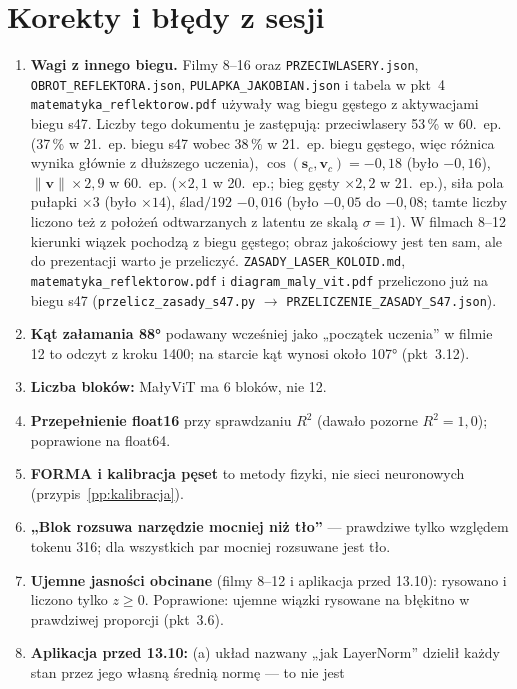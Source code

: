 \documentclass[a4paper,11pt]{article}
\begin{document}
\section{Korekty i błędy z sesji}\label{sec:korekty}
\begin{enumerate}
\item \textbf{Wagi z innego biegu.} Filmy 8--16 oraz \texttt{PRZECIWLASERY.json}, \texttt{OBROT\_REFLEKTORA.json},
\texttt{PULAPKA\_JAKOBIAN.json} i tabela w pkt~4 \texttt{matematyka\_reflektorow.pdf} używały wag biegu gęstego z aktywacjami biegu s47.
Liczby tego dokumentu je zastępują: przeciwlasery 53\,\% w 60.~ep. (37\,\% w 21.~ep. biegu s47 wobec 38\,\% w 21.~ep. biegu gęstego, więc
różnica wynika głównie z dłuższego uczenia), $\cos(\bm s_c,\bm v_c)=-0{,}18$ (było $-0{,}16$), $\lVert\bm v\rVert\times2{,}9$ w 60.~ep.
($\times2{,}1$ w 20.~ep.; bieg gęsty $\times2{,}2$ w 21.~ep.), siła pola pułapki $\times3$ (było $\times14$), ślad$/192$ $-0{,}016$
(było $-0{,}05$ do $-0{,}08$; tamte liczby liczono też z położeń odtwarzanych z latentu ze skalą $\sigma=1$).
W filmach 8--12 kierunki wiązek pochodzą z biegu gęstego; obraz jakościowy jest ten sam, ale do prezentacji warto je przeliczyć.
\texttt{ZASADY\_LASER\_KOLOID.md}, \texttt{matematyka\_reflektorow.pdf} i \texttt{diagram\_maly\_vit.pdf} przeliczono już na biegu s47
(\texttt{przelicz\_zasady\_s47.py} $\to$ \texttt{PRZELICZENIE\_ZASADY\_S47.json}).
\item \textbf{Kąt załamania 88°} podawany wcześniej jako „początek uczenia” w filmie 12 to odczyt z kroku 1400; na starcie kąt wynosi
około 107° (pkt~3.12).
\item \textbf{Liczba bloków:} MałyViT ma 6 bloków, nie 12.
\item \textbf{Przepełnienie float16} przy sprawdzaniu $R^2$ (dawało pozorne $R^2=1{,}0$); poprawione na float64.
\item \textbf{FORMA i kalibracja pęset} to metody fizyki, nie sieci neuronowych (przypis~\ref{pp:kalibracja}).
\item \textbf{„Blok rozsuwa narzędzie mocniej niż tło”} --- prawdziwe tylko względem tokenu 316; dla wszystkich par mocniej rozsuwane jest tło.
\item \textbf{Ujemne jasności obcinane} (filmy 8--12 i aplikacja przed 13.10): rysowano i liczono tylko $z\ge0$. Poprawione: ujemne
wiązki rysowane na błękitno w prawdziwej proporcji (pkt~3.6).
\item \textbf{Aplikacja przed 13.10:} (a) układ nazwany „jak LayerNorm” dzielił każdy stan przez jego własną średnią normę --- to nie jest

\end{enumerate}
\end{document}
